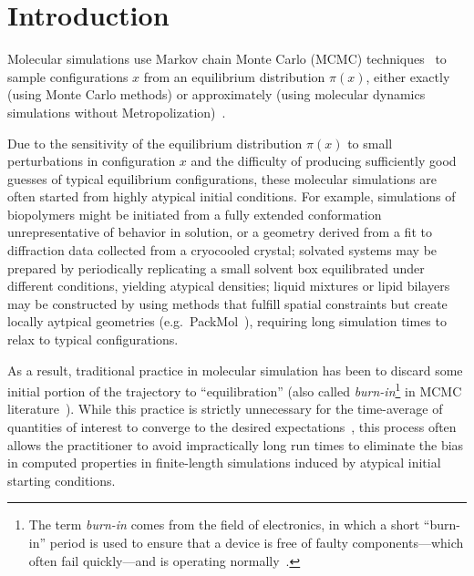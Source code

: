 \documentclass[aps,pre,twocolumn,nofootinbib,superscriptaddress,linenumbers,11point]{revtex4-1}
\begin{document}

\section*{Introduction}
\label{section:introduction}

Molecular simulations use Markov chain Monte Carlo (MCMC) techniques~\cite{jun-s-liu:mcmc} to sample configurations $x$ from an equilibrium distribution $\pi(x)$, either exactly (using Monte Carlo methods) or approximately (using molecular dynamics simulations without Metropolization)~\cite{sivak:2013:prx:vvvr}.

Due to the sensitivity of the equilibrium distribution $\pi(x)$ to small perturbations in configuration $x$ and the difficulty of producing sufficiently good guesses of typical equilibrium configurations, these molecular simulations are often started from highly atypical initial conditions.
For example, simulations of biopolymers might be initiated from a fully extended conformation unrepresentative of behavior in solution, or a geometry derived from a fit to diffraction data collected from a cryocooled crystal; 
solvated systems may be prepared by periodically replicating a small solvent box equilibrated under different conditions, yielding atypical densities; 
liquid mixtures or lipid bilayers may be constructed by using methods that fulfill spatial constraints but create locally aytpical geometries (e.g.~PackMol~\cite{martinez:jctc:2009:packmol}), requiring long simulation times to relax to typical configurations.

As a result, traditional practice in molecular simulation has been to discard some initial portion of the trajectory to ``equilibration'' (also called \emph{burn-in}\footnote{The term \emph{burn-in} comes from the field of electronics, in which a short ``burn-in'' period is used to ensure that a device is free of faulty components---which often fail quickly---and is operating normally~\cite{crc-mcmc-handbook}.} in MCMC literature~\cite{crc-mcmc-handbook}).
While this practice is strictly unnecessary for the time-average of quantities of interest to converge to the desired expectations~\cite{geyer:burn-in-unnecessary,crc-mcmc-handbook}, this process often allows the practitioner to avoid impractically long run times to eliminate the bias in computed properties in finite-length simulations induced by atypical initial starting conditions.
\end{document}
